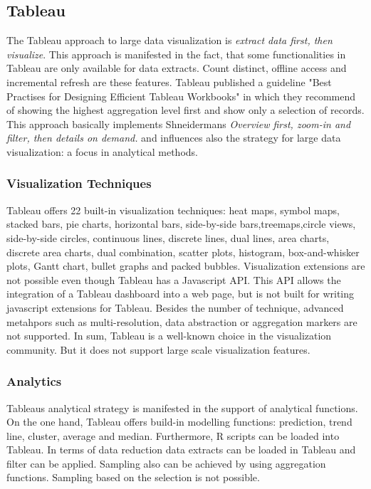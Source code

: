 \subsection*{Tableau}
The Tableau approach to large data visualization is \textit{extract data first, then visualize}. This approach is manifested in the fact, that some functionalities in Tableau are only available for data extracts. Count distinct, offline access and incremental refresh are these features.
Tableau published a guideline "Best Practises for Designing Efficient Tableau Workbooks" in which they recommend of showing the highest aggregation level first and show only a selection of records. This approach basically implements Shneidermans \textit{Overview first, zoom-in and filter, then details on demand.} and influences also the strategy for large data visualization: a focus in analytical methods. 

\subsubsection*{Visualization Techniques}
Tableau offers 22 built-in visualization techniques: heat maps, symbol maps, stacked bars, pie charts, horizontal bars, side-by-side bars,treemaps,circle views, side-by-side circles, continuous lines, discrete lines, dual lines, area charts,  discrete area charts, dual combination, scatter plots, histogram, box-and-whisker plots, Gantt chart, bullet graphs and packed bubbles.
Visualization extensions are not possible even though Tableau has a Javascript API. This API allows the integration of a Tableau dashboard into a web page, but is not built for writing javascript extensions for Tableau. Besides the number of technique, advanced metahpors such as multi-resolution, data abstraction or aggregation markers are not supported. 
In sum, Tableau is a well-known choice in the visualization community. But it does not support large scale visualization features. 

\subsubsection*{Analytics}
Tableaus analytical strategy is manifested in the support of analytical functions. On the one hand, Tableau offers build-in modelling functions: prediction, trend line, cluster, average and median. Furthermore, R scripts can be loaded into Tableau.  
In terms of data reduction data extracts can be loaded in Tableau and filter can be applied. Sampling also can be achieved by using aggregation functions. Sampling based on the selection is not possible.


